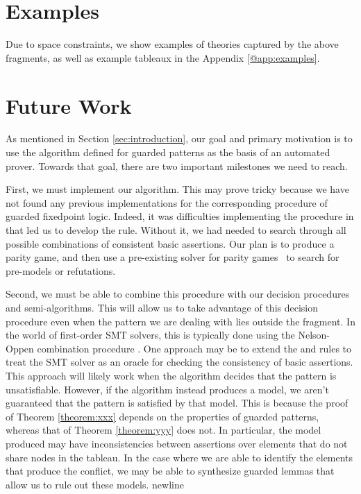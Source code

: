 \hypertarget{examples}{%
\section{Examples}\label{examples}}

Due to space constraints, we show examples of theories captured by the above fragments, as well as example tableaux in the
Appendix \ref{@app:examples}.

\hypertarget{future-work}{%
\section{Future Work}\label{future-work}}

As mentioned in Section \ref{sec:introduction},
our goal and primary motivation
is to use the algorithm defined for guarded patterns as the basis of an automated prover.
Towards that goal, there are two important milestones we need to reach.

First, we must implement our algorithm.
This may prove tricky because we have not found any previous implementations
for the corresponding procedure of guarded fixedpoint logic.
Indeed, it was difficulties implementing the procedure in \cite{guarded-fixedpoint-logic}
that led us to develop the  rule.
Without it, we had needed to search through all possible combinations of consistent basic assertions.
Our plan is to produce a parity game, and then use a pre-existing solver for parity games~\cite{friedmann2009-pgsolver}
to search for pre-models or refutations.

Second, we must be able to combine this procedure with our decision procedures
and semi-algorithms. This will allow us to take advantage of this decision
procedure even when the pattern we are dealing with lies outside the fragment.
In the world of first-order SMT solvers, this is typically done using the
Nelson-Oppen combination procedure \cite{nelsonoppen1979-cooperating-decision-procedures,@krstic2007-architecting}.
One approach may be to extend the  and  rules
to treat the SMT solver as an oracle for checking the consistency of basic assertions.
This approach will likely work when the algorithm decides that the pattern is unsatisfiable.
However, if the algorithm instead produces a model,
we aren't guaranteed that the pattern is satisfied by that model.
This is because the proof of Theorem \ref{theorem:xxx} depends on the properties of guarded patterns,
whereas that of Theorem \ref{theorem:yyy} does not.
In particular, the model produced may have inconsistencies between assertions
over elements that do not share nodes in the tableau.
In the case where we are able to identify the elements that produce the conflict,
we may be able to synthesize guarded lemmas that allow us to rule out these models.
newline

